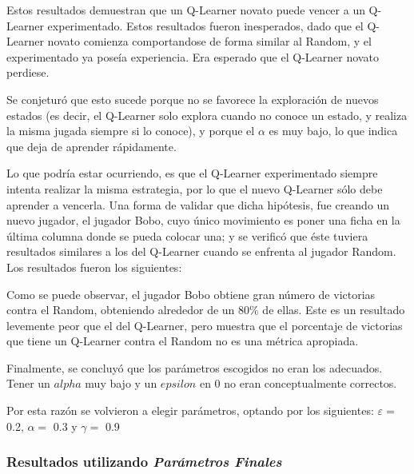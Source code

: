 
Estos resultados demuestran que un Q-Learner novato puede vencer a un Q-Learner experimentado.
Estos resultados fueron inesperados, dado que el Q-Learner novato comienza comportandose de forma similar al Random, y el experimentado ya poseía experiencia. Era esperado que el Q-Learner novato perdiese.

Se conjeturó que esto sucede porque no se favorece la exploración de nuevos estados (es decir, el Q-Learner solo explora cuando no conoce un estado, y realiza la misma jugada siempre si lo conoce), y porque el $\alpha$ es muy bajo, lo que indica que deja de aprender rápidamente.

Lo que podría estar ocurriendo, es que el Q-Learner experimentado siempre intenta realizar la misma estrategia, por lo que el nuevo Q-Learner sólo debe aprender a vencerla.
Una forma de validar que dicha hipótesis, fue creando un nuevo jugador, el jugador Bobo, cuyo único movimiento es poner una ficha en la última columna donde se pueda colocar una; y se verificó que éste tuviera resultados similares a los del Q-Learner cuando se enfrenta al jugador Random.
Los resultados fueron los siguientes:


Como se puede observar, el jugador Bobo obtiene gran número de victorias contra el Random, obteniendo alrededor de un 80\% de ellas.
Este es un resultado levemente peor que el del Q-Learner, pero muestra que el porcentaje de victorias que tiene un Q-Learner contra el Random no es una métrica apropiada.

Finalmente, se concluyó que los parámetros escogidos no eran los adecuados. Tener un $alpha$ muy bajo y un $epsilon$ en 0 no eran conceptualmente correctos.

Por esta razón se volvieron a elegir parámetros, optando por los siguientes: $\varepsilon = $ 0.2, $\alpha = $ 0.3 y $\gamma = $ 0.9

\subsubsection{Resultados utilizando \emph{Parámetros Finales}}

